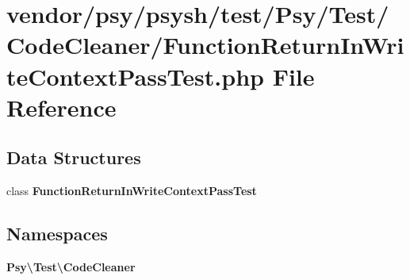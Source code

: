 \section{vendor/psy/psysh/test/\+Psy/\+Test/\+Code\+Cleaner/\+Function\+Return\+In\+Write\+Context\+Pass\+Test.php File Reference}
\label{_function_return_in_write_context_pass_test_8php}
\subsection*{Data Structures}
\begin{DoxyCompactItemize}
\item 
class {\bf Function\+Return\+In\+Write\+Context\+Pass\+Test}
\end{DoxyCompactItemize}
\subsection*{Namespaces}
\begin{DoxyCompactItemize}
\item 
 {\bf Psy\textbackslash{}\+Test\textbackslash{}\+Code\+Cleaner}
\end{DoxyCompactItemize}
